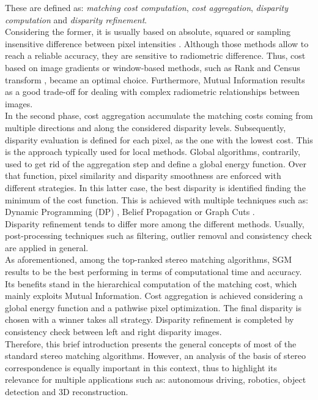 These are defined as: \textit{matching cost computation}, \textit{cost aggregation}, \textit{disparity computation} and \textit{disparity refinement}. \\
Considering the former, it is usually based on absolute, squared or sampling insensitive difference between pixel intensities \cite{Hirschmuller2008}. 
Although those methods allow to reach a reliable accuracy, they are sensitive to radiometric difference. 
Thus, cost based on image gradients or window-based methods, such as Rank and Census transform \cite{Ko2017}, became an optimal choice. 
Furthermore, Mutual Information results as a good trade-off for dealing with complex radiometric relationships between images.\\
In the second phase, cost aggregation accumulate the matching costs coming from multiple directions and along the considered disparity levels. 
Subsequently, disparity evaluation is defined for each pixel, as the one with the lowest cost.
This is the approach typically used for local methods. 
Global algorithms, contrarily, used to get rid of the aggregation step and define a global energy function. 
Over that function, pixel similarity and disparity smoothness are enforced with different strategies. 
In this latter case, the best disparity is identified finding the minimum of the cost function. 
This is achieved with multiple techniques such as: Dynamic Programming (DP) \cite{Birchfield1999}, Belief Propagation \cite{Klaus2006} or Graph Cuts \cite{Kolmogorov2001}.\\
Disparity refinement tends to differ more among the different methods. 
Usually, post-processing techniques such as filtering, outlier removal and consistency check are applied in general.\\
As aforementioned, among the top-ranked stereo matching algorithms, SGM results to be the best performing in terms of computational time and accuracy. 
Its benefits stand in the hierarchical computation of the matching cost, which mainly exploits Mutual Information. 
Cost aggregation is achieved considering a global energy function and a pathwise pixel optimization. 
The final disparity is chosen with a winner takes all strategy. 
Disparity refinement is completed by consistency check between left and right disparity images. \\
Therefore, this brief introduction presents the general concepts of most of the standard stereo matching algorithms.
However, an analysis of the basis of stereo correspondence is equally important in this context, thus to highlight its relevance for multiple applications such as: autonomous driving, robotics, object detection and 3D reconstruction. \\

